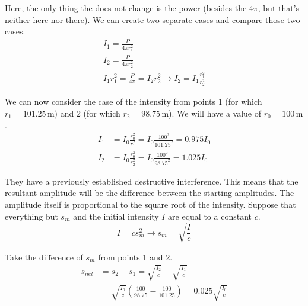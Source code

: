 \documentclass[12pt]{article}
\begin{document}
                Here, the only thing the does not change is the power (besides the $4\pi$, but that's neither here nor there).
                We can create two separate cases and compare those two cases.
                \begin{gather}
                    I_1 = \frac{P}{4\pi r_1^2}\\
                    I_2 = \frac{P}{4\pi r_2^2}\\
                    I_1 r_1^2 = \frac{P}{4\pi} = I_2 r_2^2 \to 
                    I_2 = I_1 \frac{r_1^2}{r_2^2}
                \end{gather}

                We can now consider the case of the intensity from points 1 (for which $r_1 = 101.25\,\unit{\meter}$) and 2 (for which $r_2 = 98.75\,\unit{\meter}$).
                We will have a value of $r_0 = 100\,\unit{\meter}$.
                \begin{align}
                    I_1 &=  I_0 \frac{r_0^2}{r_1^2}
                        =   I_0 \frac{100^2}{101.25^2}
                        =   0.975 I_0\\
                    I_2 &=  I_0 \frac{r_0^2}{r_2^2}
                        =   I_0 \frac{100^2}{98.75^2}
                        =   1.025 I_0
                \end{align}

                They have a previously established destructive interference.
                This means that the resultant amplitude will be the difference between the starting amplitudes.
                The amplitude itself is proportional to the square root of the intensity.
                Suppose that everything but $s_m$ and the initial intensity $I$ are equal to a constant $c$.
                \begin{equation}
                    I = c s_m^2 \to s_m = \sqrt{\frac{I}{c}}
                \end{equation}

                Take the difference of $s_m$ from points 1 and 2.
                \begin{align}
                    s_{net} &=  s_2 - s_1
                        =   \sqrt{\frac{I_2}{c}} - \sqrt{\frac{I_1}{c}}\\
                        &=  \sqrt{\frac{I_0}{c}} \left( \frac{100}{98.75} - \frac{100}{101.25} \right)
                        =   0.025 \sqrt{\frac{I_0}{c}}
                \end{align}
\end{document}
